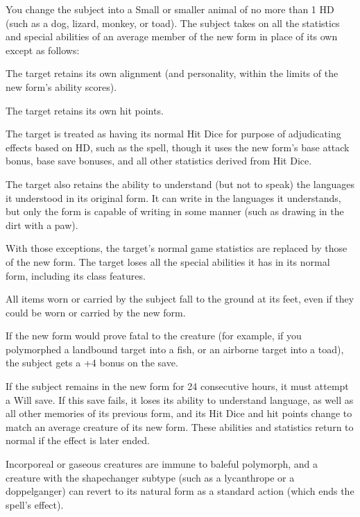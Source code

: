 You change the subject into a Small or smaller animal of no more than 1 HD (such as a dog, lizard, monkey, or toad). 
The subject takes on all the statistics and special abilities of an average member of the new form in place of its own except as follows:

\begin{list}{}{\leftmargin=1em}
 \item The target retains its own alignment (and personality, within the limits of the new form's ability scores).
 \item The target retains its own hit points.
 \item The target is treated as having its normal Hit Dice for purpose of adjudicating effects based on HD, such as the  spell, though it uses the new form's base attack bonus, base save bonuses, and all other statistics derived from Hit Dice.
 \item The target also retains the ability to understand (but not to speak) the languages it understood in its original form. It can write in the languages it understands, but only the form is capable of writing in some manner (such as drawing in the dirt with a paw).
\end{list}
With those exceptions, the target's normal game statistics are replaced by those of the new form. The target loses all the special abilities it has in its normal form, including its class features.

All items worn or carried by the subject fall to the ground at its feet, even if they could be worn or carried by the new form.

If the new form would prove fatal to the creature (for example, if you polymorphed a landbound target into a fish, or an airborne target into a toad), the subject gets a +4 bonus on the save.

If the subject remains in the new form for 24 consecutive hours, it must attempt a Will save. 
If this save fails, it loses its ability to understand language, as well as all other memories of its previous form, and its Hit Dice and hit points change to match an average creature of its new form. These abilities and statistics return to normal if the effect is later ended.

Incorporeal or gaseous creatures are immune to baleful polymorph, and a creature with the shapechanger subtype (such as a lycanthrope or a doppelganger) can revert to its natural form as a standard action (which ends the spell's effect).


